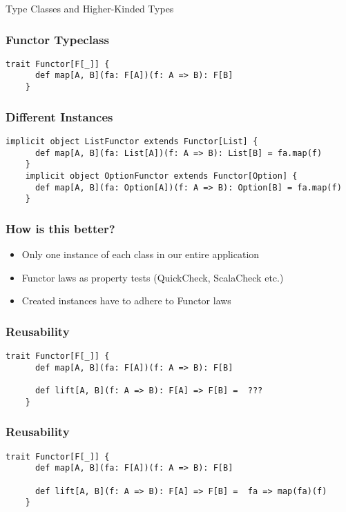 \begin{section}{Type Classes and Higher-Kinded Types}
\begin{frame}[fragile]
  \frametitle{Functor Typeclass}
  \begin{lstlisting}[style=scala]
    trait Functor[F[_]] {
      def map[A, B](fa: F[A])(f: A => B): F[B]
    }
  \end{lstlisting}
\end{frame}

\begin{frame}[fragile]
  \frametitle{Different Instances}
  \begin{lstlisting}[style=scala]
    implicit object ListFunctor extends Functor[List] {
      def map[A, B](fa: List[A])(f: A => B): List[B] = fa.map(f)
    }
    implicit object OptionFunctor extends Functor[Option] {
      def map[A, B](fa: Option[A])(f: A => B): Option[B] = fa.map(f)
    }
  \end{lstlisting}
\end{frame}

\begin{frame}[fragile]
  \frametitle{How is this better?}
  \begin{itemize}
  \item Only one instance of each class in our entire application
  \item Functor laws as property tests (QuickCheck, ScalaCheck etc.)
  \item Created instances have to adhere to Functor laws
  \end{itemize}
\end{frame}

\begin{frame}[fragile]
  \frametitle{Reusability}
  \begin{lstlisting}[style=scala]
    trait Functor[F[_]] {
      def map[A, B](fa: F[A])(f: A => B): F[B]

      def lift[A, B](f: A => B): F[A] => F[B] =  ???
    }
  \end{lstlisting}
\end{frame}

\begin{frame}[fragile]
  \frametitle{Reusability}
  \begin{lstlisting}[style=scala]
    trait Functor[F[_]] {
      def map[A, B](fa: F[A])(f: A => B): F[B]

      def lift[A, B](f: A => B): F[A] => F[B] =  fa => map(fa)(f)
    }
  \end{lstlisting}
\end{frame}
\end{section}

